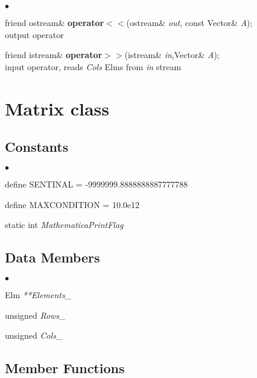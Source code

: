 \documentclass{article}
\newcommand{\Func}[1]{\textbf{#1}}
\newcommand{\var}[1]{\textit{#1}}
\newcommand{\defn}[1]{\textrm{#1}}
\newenvironment{LIST}{\begin{list}{$\bullet$}{%
      \setlength{\leftmargin}{2\leftmargin}%
      \setlength{\itemindent}{-1cm}}}%
  {\end{list}}
\begin{document}
\begin{LIST}
 \item friend ostream\& \Func{operator$<<$}(ostream\& \var{out},
  const Vector\& \var{A});\\
  output operator
 \item friend istream\& \Func{operator$>>$}(istream\& \var{in},Vector\& \var{A});\\
  input operator, reads \var{Cols} Elms from \var{in} stream
\end{LIST}

\section{Matrix class}

\subsection{Constants}

\begin{LIST}
 \item define \defn{SENTINAL} = -9999999.8888888887777788\\
 \item define \defn{MAXCONDITION} = 10.0e12\\
 \item static int \var{MathematicaPrintFlag}\\
\end{LIST}

\subsection{Data Members}

\begin{LIST}
 \item Elm \var{**Elements\_}\\
 \item unsigned \var{Rows\_}\\
 \item unsigned \var{Cols\_}\\
\end{LIST}

\subsection{Member Functions}
\end{document}
